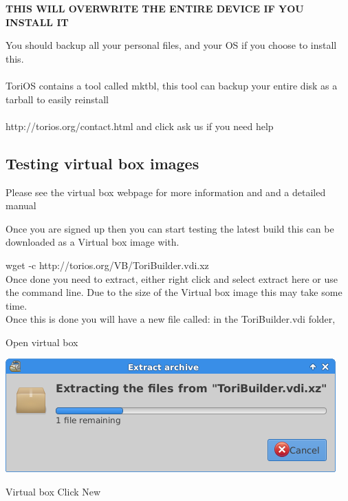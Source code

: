 \documentclass[12pt,a4paper]{book}
\begin{document}
\begin{center}

\textbf{THIS WILL OVERWRITE THE ENTIRE DEVICE IF YOU 
INSTALL IT} \\

\end{center}

You should backup all your  personal files, and your OS if you choose to install this.\\ \\
ToriOS contains a tool called mktbl, this tool can backup your entire disk as a tarball to easily reinstall \\ \\
http://torios.org/contact.html and click ask us if you need help \\
 
\newpage

\subsection {Testing virtual box images}
Please see the virtual box webpage for more information and and a detailed manual \cite{VirtualBox}

Once you are signed up then you can start testing the latest build this can be downloaded as a Virtual box image with.

wget -c http://torios.org/VB/ToriBuilder.vdi.xz \\

Once done you need to extract,   either right click and select extract here or use the command line.  Due to the size of the Virtual box image this may take some time. \\

Once this is done you will have a new file called:    in the ToriBuilder.vdi folder,  


Open virtual box

\begin{center}
\includegraphics[width=0.7\linewidth]{extractVBimage}
\end{center}

Virtual box 
Click New
\end{document}
